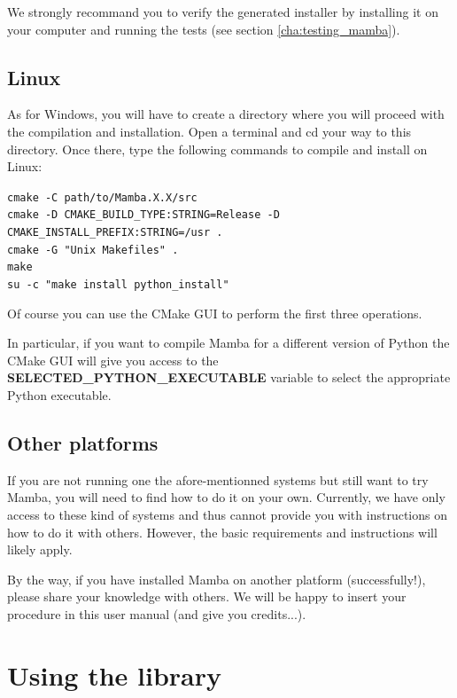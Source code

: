 \documentclass[a4paper,10pt,oneside]{article}
\begin{document}
We strongly recommand you to verify the generated installer by installing it on
your computer and running the tests (see section \ref{cha:testing_mamba}).

\subsection{Linux}

As for Windows, you will have to create a directory where you will proceed with
the compilation and installation. Open a terminal and cd your way to this 
directory. Once there, type the following commands to compile and install on Linux:

\texttt{cmake -C path/to/Mamba.X.X/src}\\
\texttt{cmake -D CMAKE\_BUILD\_TYPE:STRING=Release -D CMAKE\_INSTALL\_PREFIX:STRING=/usr .}\\
\texttt{cmake -G "Unix Makefiles" .}\\
\texttt{make}\\
\texttt{su -c "make install python\_install"}

Of course you can use the CMake GUI to perform the first three operations.

In particular, if you want to compile Mamba for a different version of Python
the CMake GUI will give you access to the \textbf{SELECTED\_PYTHON\_EXECUTABLE}
variable to select the appropriate Python executable.

\subsection{Other platforms}

If you are not running one the afore-mentionned systems but still want to try
Mamba, you will need to find how to do it on your own. Currently, we have only access to
these kind of systems and thus cannot provide you with instructions on how to do
it with others. However, the basic requirements and instructions will likely apply.

By the way, if you have installed Mamba on another platform (successfully!), please
share your knowledge with others. We will be happy to insert your procedure in this
user manual (and give you credits...).

\pagebreak

\section{Using the library}
\label{cha:using_library}
\end{document}
